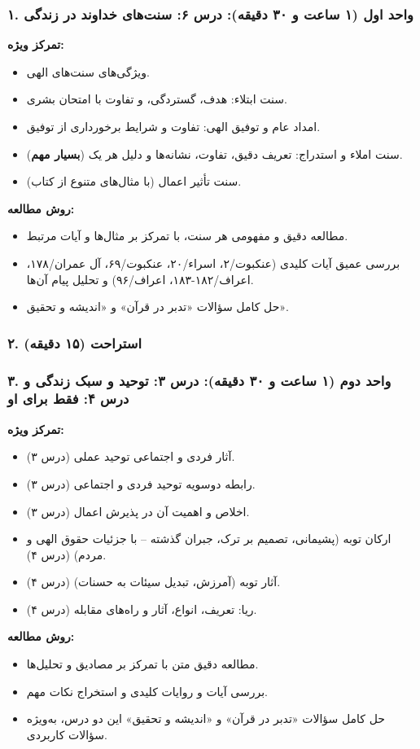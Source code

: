 \documentclass[12pt,a4paper]{article}
\begin{document}
\subsubsection*{۱. واحد اول (۱ ساعت و ۳۰ دقیقه): درس ۶: سنت‌های خداوند در زندگی}
\textbf{تمرکز ویژه:}
\begin{itemize}
    \item ویژگی‌های سنت‌های الهی.
    \item سنت ابتلاء: هدف، گستردگی، و تفاوت با امتحان بشری.
    \item امداد عام و توفیق الهی: تفاوت و شرایط برخورداری از توفیق.
    \item سنت املاء و استدراج: تعریف دقیق، تفاوت، نشانه‌ها و دلیل هر یک (\textbf{بسیار مهم}).
    \item سنت تأثیر اعمال (با مثال‌های متنوع از کتاب).
\end{itemize}
\textbf{روش مطالعه:}
\begin{itemize}
    \item مطالعه دقیق و مفهومی هر سنت، با تمرکز بر مثال‌ها و آیات مرتبط.
    \item بررسی عمیق آیات کلیدی (عنکبوت/۲، اسراء/۲۰، عنکبوت/۶۹، آل عمران/۱۷۸، اعراف/۱۸۲-۱۸۳، اعراف/۹۶) و تحلیل پیام آن‌ها.
    \item حل کامل سؤالات «تدبر در قرآن» و «اندیشه و تحقیق».
\end{itemize}

\subsubsection*{۲. استراحت (۱۵ دقیقه)}

\subsubsection*{۳. واحد دوم (۱ ساعت و ۳۰ دقیقه): درس ۳: توحید و سبک زندگی و درس ۴: فقط برای او}
\textbf{تمرکز ویژه:}
\begin{itemize}
    \item آثار فردی و اجتماعی توحید عملی (درس ۳).
    \item رابطه دوسویه توحید فردی و اجتماعی (درس ۳).
    \item اخلاص و اهمیت آن در پذیرش اعمال (درس ۳).
    \item ارکان توبه (پشیمانی، تصمیم بر ترک، جبران گذشته – با جزئیات حقوق الهی و مردم) (درس ۴).
    \item آثار توبه (آمرزش، تبدیل سیئات به حسنات) (درس ۴).
    \item ریا: تعریف، انواع، آثار و راه‌های مقابله (درس ۴).
\end{itemize}
\textbf{روش مطالعه:}
\begin{itemize}
    \item مطالعه دقیق متن با تمرکز بر مصادیق و تحلیل‌ها.
    \item بررسی آیات و روایات کلیدی و استخراج نکات مهم.
    \item حل کامل سؤالات «تدبر در قرآن» و «اندیشه و تحقیق» این دو درس، به‌ویژه سؤالات کاربردی.
\end{itemize}
\end{document}

